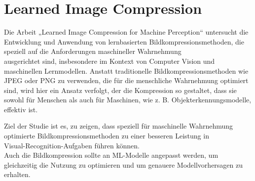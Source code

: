 \newpage
    \section{Learned Image Compression}
        \cite{image_compression_paper} Die Arbeit „Learned Image Compression for Machine Perception“ untersucht die Entwicklung und Anwendung von lernbasierten Bildkompressionsmethoden, die speziell auf die Anforderungen maschineller Wahrnehmung\\
        ausgerichtet sind, insbesondere im Kontext von Computer Vision und maschinellen Lernmodellen. Anstatt traditionelle Bildkompressionsmethoden wie JPEG oder PNG zu verwenden, die für die menschliche Wahrnehmung optimiert sind, wird hier ein Ansatz verfolgt, der die Kompression so gestaltet, dass sie sowohl für Menschen als auch für Maschinen, wie z. B. Objekterkennungsmodelle, effektiv ist.

        Ziel der Studie ist es, zu zeigen, dass speziell für maschinelle Wahrnehmung\\
        optimierte Bildkompressionsmethoden zu einer besseren Leistung in\\
        Visual-Recognition-Aufgaben führen können.\\
        Auch die Bildkompression sollte an ML-Modelle angepasst werden, um gleichzeitig die Nutzung zu optimieren und um genauere Modellvorhersagen zu erhalten.\\

